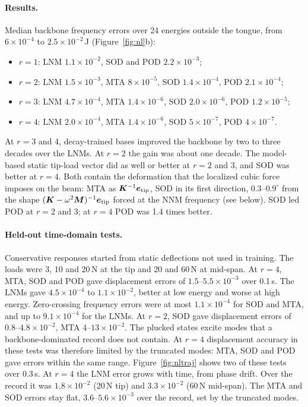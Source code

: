 \documentclass[preprint,12pt]{elsarticle}
\begin{document}
\paragraph{Results.} Median backbone frequency errors over 24 energies outside the tongue, from $6\times10^{-4}$ to $2.5\times10^{-2}$\,J (Figure~\ref{fig:nl}b):
\begin{itemize}
\item $r=1$: LNM $1.1\times10^{-2}$, SOD and POD $2.2\times10^{-3}$;
\item $r=2$: LNM $1.5\times10^{-3}$, MTA $8\times10^{-5}$, SOD $1.4\times10^{-4}$, POD $2.1\times10^{-4}$;
\item $r=3$: LNM $4.7\times10^{-4}$, MTA $1.4\times10^{-6}$, SOD $2.0\times10^{-6}$, POD $1.2\times10^{-5}$;
\item $r=4$: LNM $2.0\times10^{-4}$, MTA $1.4\times10^{-6}$, SOD $5\times10^{-7}$, POD $4\times10^{-7}$.
\end{itemize}
At $r=3$ and 4, decay-trained bases improved the backbone by two to three decades over the LNMs. At $r=2$ the gain was about one decade. The model-based static tip-load vector did as well or better at $r=2$ and 3, and SOD was better at $r=4$.
Both contain the deformation that the localized cubic force imposes on the beam: MTA as $\bm{K}^{-1}\bm{e}_{\mathrm{tip}}$, SOD in its first direction, $0.3$--$0.9^\circ$ from the shape $(\bm{K}-\omega^2\bm{M})^{-1}\bm{e}_{\mathrm{tip}}$ forced at the NNM frequency (see below).
SOD led POD at $r=2$ and 3; at $r=4$ POD was 1.4 times better.

\paragraph{Held-out time-domain tests.} Conservative responses started from static deflections not used in training. The loads were 3, 10 and 20\,N at the tip and 20 and 60\,N at mid-span.
At $r=4$, MTA, SOD and POD gave displacement errors of $1.5$--$5.5\times10^{-3}$ over 0.1\,s. The LNMs gave $4.5\times10^{-4}$ to $1.1\times10^{-2}$, better at low energy and worse at high energy. Zero-crossing frequency errors were at most $1.1\times10^{-4}$ for SOD and MTA, and up to $9.1\times10^{-4}$ for the LNMs.
At $r=2$, SOD gave displacement errors of $0.8$--$4.8\times10^{-2}$, MTA $4$--$13\times10^{-2}$.
The plucked states excite modes that a backbone-dominated record does not contain. At $r=4$ displacement accuracy in these tests was therefore limited by the truncated modes: MTA, SOD and POD gave errors within the same range.
Figure~\ref{fig:nltraj} shows two of these tests over 0.3\,s. At $r=4$ the LNM error grows with time, from phase drift. Over the record it was $1.8\times10^{-2}$ (20\,N tip) and $3.3\times10^{-2}$ (60\,N mid-span). The MTA and SOD errors stay flat, $3.6$--$5.6\times10^{-3}$ over the record, set by the truncated modes.
\end{document}
